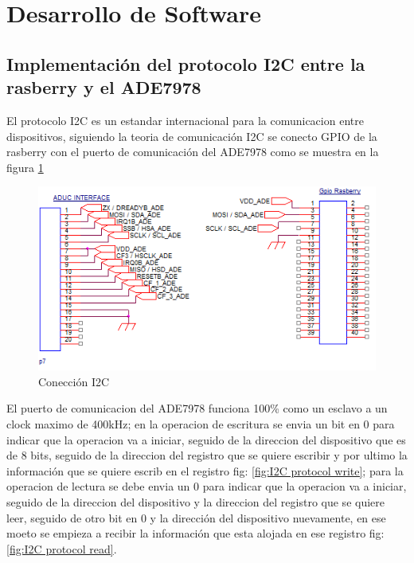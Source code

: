 \section{Desarrollo de Software}
    \subsection{Implementación del protocolo I2C entre la rasberry y el ADE7978}

        El protocolo I2C es un estandar internacional para la comunicacion entre dispositivos, siguiendo la teoria de comunicación I2C se conecto GPIO de la rasberry con el puerto de comunicación del ADE7978 como se muestra en la figura 
        \ref{fig:Coneccion I2C}\\
        \begin{figure}[H]
            \begin{center}
                \includegraphics[width = 15cm]{3Proyecto/I2Cconnection.png}
                \caption{ Conección I2C } 
                \label{fig:Coneccion I2C}
            \end{center}
        \end{figure}

        El puerto de comunicacion del ADE7978 funciona 100\% como un esclavo a un clock maximo de 400kHz; en la operacion de escritura se envia un bit en 0  para indicar que la operacion va a iniciar, seguido de la direccion del dispositivo que es de 8 bits, seguido de la direccion del registro que se quiere escribir y por ultimo la información que se quiere escrib en el registro fig: \ref{fig:I2C protocol write}; para la operacion de lectura se debe envia un 0 para indicar que la operacion va a iniciar, seguido de la direccion del dispositivo y la direccion del registro que se quiere leer, seguido de otro bit en 0 y la dirección del dispositivo nuevamente, en ese moeto se empieza a recibir la información que esta alojada en ese registro fig: \ref{fig:I2C protocol read}.
        
